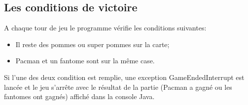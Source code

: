 \subsection{Les conditions de victoire}

A chaque tour de jeu le programme vérifie les conditions suivantes: \\
\begin{itemize}
	\item Il reste des pommes ou super pommes sur la carte;
	\item Pacman et un fantome sont sur la même case.
\end{itemize}

Si l'une des deux condition est remplie, une exception GameEndedInterrupt est lancée et le jeu s'arrête avec le résultat de la partie (Pacman a gagné ou les fantomes ont gagnés) affiché dans la console Java.